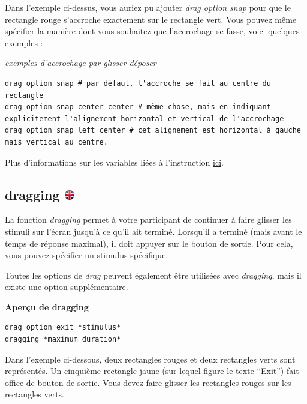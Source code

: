 \documentclass[
]{book}
\begin{document}
Dans l'exemple ci-dessus, vous auriez pu ajouter \emph{drag option snap} pour que le rectangle rouge s'accroche exactement sur le rectangle vert. Vous pouvez même spécifier la manière dont vous souhaitez que l'accrochage se fasse, voici quelques exemples :

\emph{exemples d'accrochage par glisser-déposer}

\begin{verbatim}
drag option snap # par défaut, l'accroche se fait au centre du rectangle
drag option snap center center # même chose, mais en indiquant explicitement l'alignement horizontal et vertical de l'accrochage
drag option snap left center # cet alignement est horizontal à gauche mais vertical au centre.
\end{verbatim}

Plus d'informations sur les variables liées à l'instruction \protect\hyperlink{drag-variables}{ici}.

\hypertarget{dragging}{%
\subsection[dragging ]{\texorpdfstring{dragging \href{https://www.psytoolkit.org/doc3.4.0/syntax.html\#task-dragging}{\protect\includegraphics{img/ukflag.png}}}{dragging }}\label{dragging}}

La fonction \emph{dragging} permet à votre participant de continuer à faire glisser les stimuli sur l'écran jusqu'à ce qu'il ait terminé. Lorsqu'il a terminé (mais avant le temps de réponse maximal), il doit appuyer sur le bouton de sortie. Pour cela, vous pouvez spécifier un stimulus spécifique.

Toutes les options de \emph{drag} peuvent également être utilisées avec \emph{dragging}, mais il existe une option supplémentaire.

\textbf{Aperçu de dragging}

\begin{verbatim}
drag option exit *stimulus*
dragging *maximum_duration*
\end{verbatim}

Dans l'exemple ci-dessous, deux rectangles rouges et deux rectangles verts sont représentés. Un cinquième rectangle jaune (sur lequel figure le texte ``Exit'') fait office de bouton de sortie. Vous devez faire glisser les rectangles rouges sur les rectangles verts.
\end{document}

